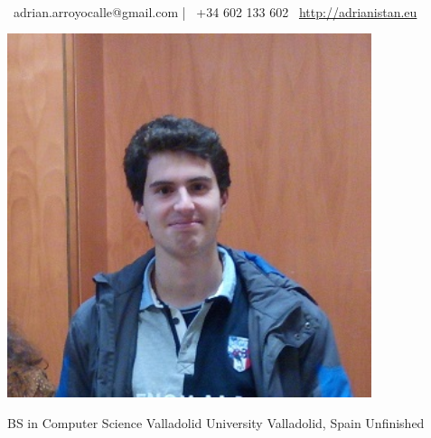 \documentclass[]{awesome-cv}
\begin{document}
\begin{minipage}[b]{0.66666\textwidth}
\begin{center}
	  \\
	\vspace{2mm}
	{\faEnvelope\ adrian.arroyocalle@gmail.com} | {\faMobile\ +34 602 133 602}  {\faLink\ \url{http://adrianistan.eu}}
\end{center}
\end{minipage}
\begin{minipage}[b]{0.33333\textwidth}
	\includegraphics[width=0.8\textwidth]{stallman.jpg}
\end{minipage}

\begin{cventries}
	\cventry
	{BS in Computer Science}
	{Valladolid University}
	{Valladolid, Spain}
	{Unfinished}
	{}
\end{cventries}
\end{document}
